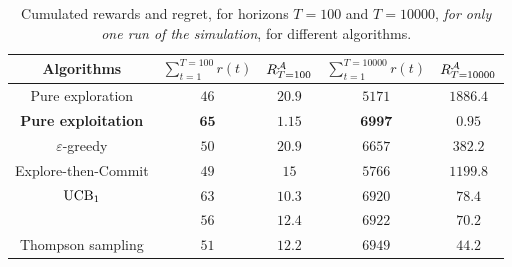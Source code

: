 \begin{table}[ht]
    \begin{small}  %
        \centering
        \begin{tabular}{c|cc|cc}
        \textbf{Algorithms} & $\sum\limits_{t=1}^{T=100} r(t)$ & $R_{T=100}^{\mathcal{A}}$ & $\sum\limits_{t=1}^{T=10000} r(t)$ & $R_{T=10000}^{\mathcal{A}}$ \\
            \hline
            Pure exploration
                & $46$ & $20.9$
                & $5171$ & $1886.4$ \\
            \textbf{Pure exploitation}
                & $\mathbf{65}$ & $\mathbf{1.15}$
                & $\mathbf{6997}$ & $\mathbf{0.95}$ \\
            \hline
            $\varepsilon$-greedy
                & $50$ & $20.9$
                & $6657$ & $382.2$ \\
            Explore-then-Commit
                & $49$ & $15$
                & $5766$ & $1199.8$ \\
            \hline
            $\mathrm{UCB}_1$
                & $63$ & $10.3$
                & $6920$ & $78.4$ \\
            \klUCB{}
                & $56$ & $12.4$
                & $6922$ & $70.2$ \\
            \hline
            Thompson sampling
                & $51$ & $12.2$
                & $6949$ & $44.2$ \\
        \end{tabular}
        \caption{Cumulated rewards and regret, for horizons $T=100$ and $T=10000$, \emph{for only one run of the simulation}, for different algorithms.}
        \label{table:2:oneShotResult}
    \end{small}  %
\end{table}

